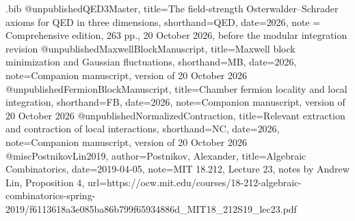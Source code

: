 \begin{filecontents*}[overwrite]{\jobname.bib}
@unpublished{QED3Master,
 title={The field-strength {Osterwalder--Schrader} axioms for {QED} in three dimensions},
 shorthand={QED}, date={2026}, note = {Comprehensive edition, 263 pp., 20 October 2026, before the modular integration revision}}
@unpublished{MaxwellBlockManuscript,
 title={Maxwell block minimization and Gaussian fluctuations},
 shorthand={MB}, date={2026}, note={Companion manuscript, version of 20 October 2026}}
@unpublished{FermionBlockManuscript,
 title={Chamber fermion locality and local integration},
 shorthand={FB}, date={2026}, note={Companion manuscript, version of 20 October 2026}}
@unpublished{NormalizedContraction,
 title={Relevant extraction and contraction of local interactions},
 shorthand={NC}, date={2026}, note={Companion manuscript, version of 20 October 2026}}
@misc{PostnikovLin2019,
 author={Postnikov, Alexander}, title={Algebraic Combinatorics},
 date={2019-04-05}, note={MIT 18.212, Lecture 23, notes by Andrew Lin, Proposition 4},
 url={https://ocw.mit.edu/courses/18-212-algebraic-combinatorics-spring-2019/f6113618a3e085ba86b799f65934886d_MIT18_212S19_lec23.pdf}}
\end{filecontents*}
\documentclass[11pt,letterpaper,reqno]{amsart}
\makeatletter
{}[2020/10/01]

\RequirePackage[T1]{fontenc}
\RequirePackage{lmodern}
\RequirePackage{microtype}
\RequirePackage[letterpaper,margin=1in,headheight=15pt]{geometry}
\RequirePackage{amsmath,amsthm,amssymb,mathtools}
\RequirePackage{enumitem}
\RequirePackage{perpage}
\RequirePackage{xcolor}
\RequirePackage[breaklinks=true,colorlinks=true,
  linkcolor=manuscriptred,citecolor=manuscriptblue,urlcolor=manuscriptmagenta]{hyperref}
\RequirePackage{cleveref}

\setcounter{tocdepth}{1}
\renewcommand{\thefigure}{\Roman{figure}}
\renewcommand{\thetable}{\Roman{table}}
\renewcommand{\thefootnote}{%
  \ifnum\value{footnote}>9\arabic{footnote}\else\fnsymbol{footnote}\fi}

